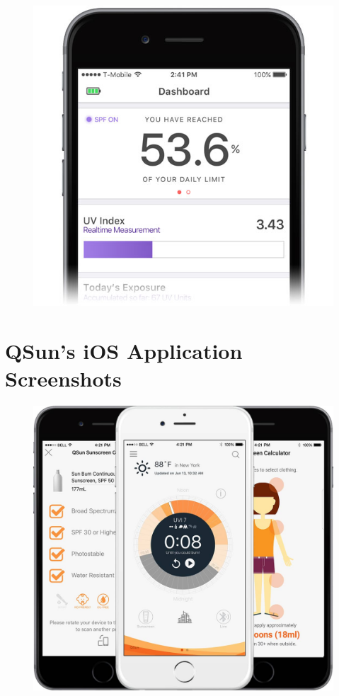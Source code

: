 \documentclass[12pt,openany,a4paper]{book}
\begin{document}
\begin{figure}[h]
\includegraphics[width=\textwidth]{ShadeMeasurement.jpg}
\end{figure}

\chapter{QSun's iOS Application Screenshots}
\label{app:qsun_screenshots}

\begin{figure}[h]
\includegraphics[width=\textwidth]{QSunApp.jpg}
\end{figure}
\end{document}
